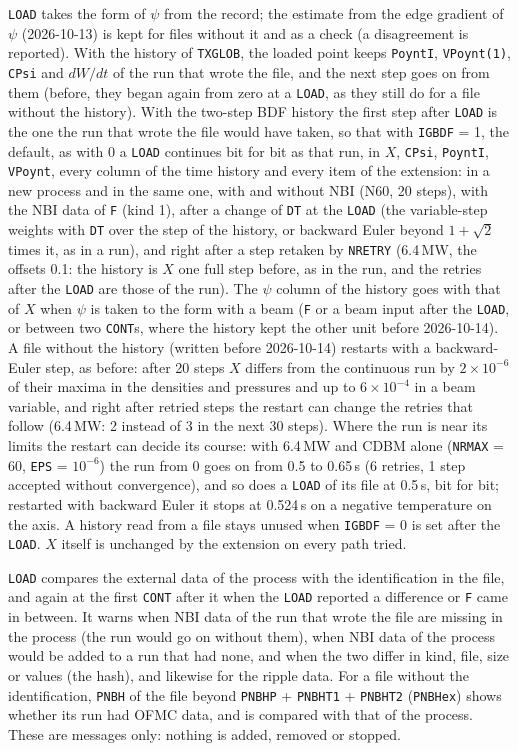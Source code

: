 \documentclass[11pt]{article}
\begin{document}
\texttt{LOAD} takes the form of $\psi$ from the record; the estimate from the edge gradient
of $\psi$ (2026-10-13) is kept for files without it and as a check (a disagreement is
reported).  With the history of \texttt{TXGLOB}, the loaded point keeps \texttt{PoyntI},
\texttt{VPoynt(1)}, \texttt{CPsi} and $dW/dt$ of the run that wrote the file, and the next step
goes on from them (before, they began again from zero at a \texttt{LOAD}, as they still do for
a file without the history).  With the two-step BDF history the first step after \texttt{LOAD} is
the one the run that wrote the file would have taken, so that with \texttt{IGBDF} = 1, the
default, as with 0 a \texttt{LOAD} continues bit for bit as that run, in $X$, \texttt{CPsi},
\texttt{PoyntI}, \texttt{VPoynt}, every column of the time history and every item of the
extension: in a new process and in the same one, with and without NBI (N60, 20 steps), with the
NBI data of \texttt{F} (kind 1), after a change of \texttt{DT} at the \texttt{LOAD} (the
variable-step weights with \texttt{DT} over the step of the history, or backward Euler beyond
$1+\sqrt2$ times it, as in a run), and right after a step retaken by \texttt{NRETRY} (6.4\,MW, the
offsets 0.1: the history is $X$ one full step before, as in the run, and the retries after the
\texttt{LOAD} are those of the run).  The $\psi$ column of the history goes with that of $X$ when
$\psi$ is taken to the form with a beam (\texttt{F} or a beam input after the \texttt{LOAD}, or
between two \texttt{CONT}s, where the history kept the other unit before 2026-10-14).  A file
without the history (written before 2026-10-14) restarts with a backward-Euler step, as before:
after 20 steps $X$ differs from the continuous run by $2\times10^{-6}$ of their maxima in the
densities and pressures and up to $6\times10^{-4}$ in a beam variable, and right after retried
steps the restart can change the retries that follow (6.4\,MW: 2 instead of 3 in the next 30
steps).  Where the run is near its limits the restart can decide its course: with 6.4\,MW and
CDBM alone (\texttt{NRMAX} = 60, \texttt{EPS} = $10^{-6}$) the run from 0 goes on from 0.5 to
0.65\,s (6 retries, 1 step accepted without convergence), and so does a \texttt{LOAD} of its file
at 0.5\,s, bit for bit; restarted with backward Euler it stops at 0.524\,s on a negative temperature
on the axis.  A history read from a file stays unused when \texttt{IGBDF} = 0 is set after the
\texttt{LOAD}.  $X$ itself is unchanged by the extension on every path tried.

\texttt{LOAD} compares the external data of the process with the identification in the file,
and again at the first \texttt{CONT} after it when the \texttt{LOAD} reported a difference or
\texttt{F} came in between.  It warns when NBI data of the run that wrote the file are missing
in the process (the run would go on without them), when NBI data of the process would be added
to a run that had none, and when the two differ in kind, file, size or values (the hash), and
likewise for the ripple data.  For a file without the identification, \texttt{PNBH} of the file
beyond \texttt{PNBHP} + \texttt{PNBHT1} + \texttt{PNBHT2} (\texttt{PNBHex}) shows whether its run
had OFMC data, and is compared with that of the process.  These are messages only: nothing is
added, removed or stopped.
\end{document}
